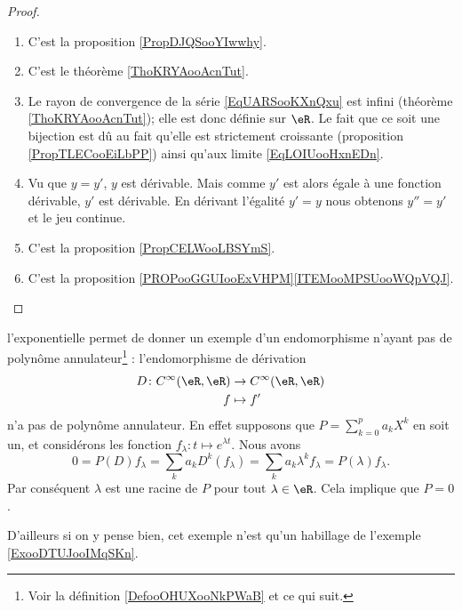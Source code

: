 \begin{proof}
    \begin{enumerate}
        \item
            C'est la proposition \ref{PropDJQSooYIwwhy}.
        \item 
            C'est le théorème \ref{ThoKRYAooAcnTut}.
        \item
            Le rayon de convergence de la série \eqref{EqUARSooKXnQxu} est infini (théorème \ref{ThoKRYAooAcnTut}); elle est donc définie sur \( \eR\). Le fait que ce soit une bijection est dû au fait qu'elle est strictement croissante (proposition \ref{PropTLECooEiLbPP}) ainsi qu'aux limite \eqref{EqLOIUooHxnEDn}.
        \item
            Vu que \( y=y'\), \( y\) est dérivable. Mais comme \( y'\) est alors égale à une fonction dérivable, \( y'\) est dérivable. En dérivant l'égalité \( y'=y\) nous obtenons \( y''=y'\) et le jeu continue.
        \item
            C'est la proposition \ref{PropCELWooLBSYmS}.
        \item
            C'est la proposition \ref{PROPooGGUIooExVHPM}\ref{ITEMooMPSUooWQpVQJ}.
    \end{enumerate}
\end{proof}

\begin{example}     \label{ExooLRHCooMYLQTU}
    l'exponentielle permet de donner un exemple d'un endomorphisme n'ayant pas de polynôme annulateur\footnote{Voir la définition \ref{DefooOHUXooNkPWaB} et ce qui suit.} : l'endomorphisme de dérivation
    \begin{equation}
        \begin{aligned}
            D\colon C^{\infty}(\eR,\eR)&\to  C^{\infty}(\eR,\eR) \\
            f&\mapsto f' 
        \end{aligned}
    \end{equation}
    n'a pas de polynôme annulateur. En effet supposons que \( P=\sum_{k=0}^{p}a_kX^k\) en soit un, et considérons les fonction \( f_{\lambda}\colon t\mapsto  e^{\lambda t}\). Nous avons
    \begin{equation}
            0=P(D)f_{\lambda}
            =\sum_ka_kD^k(f_{\lambda})
            =\sum_ka_k\lambda^kf_{\lambda}
            =P(\lambda)f_{\lambda}.
    \end{equation}
    Par conséquent \( \lambda\) est une racine de \( P\) pour tout \( \lambda\in \eR\). Cela implique que \( P=0\).
    
    D'ailleurs si on y pense bien, cet exemple n'est qu'un habillage de l'exemple \ref{ExooDTUJooIMqSKn}.
\end{example}

